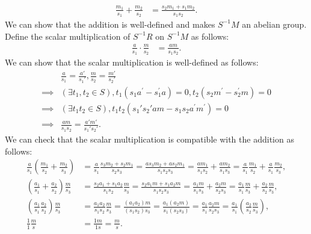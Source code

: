 \begin{solution}
    \begin{align*}
        \frac{m_1}{s_1}+\frac{m_2}{s_2}&=\frac{s_2m_1+s_1m_2}{s_1s_2}.
    \end{align*}
    We can show that the addition is well-defined and makes $S^{-1} M$ an abelian group.\\
    Define the scalar multiplication of $S^{-1}R$ on $S^{-1} M$ as follows:
    \begin{align*}
        \frac{a}{s_1}\cdot\frac{m}{s_2}&=\frac{am}{s_1s_2}.
    \end{align*}
    We can show that the scalar multiplication is well-defined as follows:
    \begin{align*}
        &\frac{a}{s_1}=\frac{a'}{s_1'},\frac{m}{s_2}=\frac{m'}{s_2'}\\
        \implies& (\exists t_1,t_2 \in S), t_1\left(s_1a^{\prime}-s_1^{\prime} a\right)=0,t_2\left(s_2m^{\prime}-s_2^{\prime} m\right)=0\\
        \implies& (\exists t_1t_2 \in S), t_1t_2\left(s_1's_2'am-s_1s_2a^{\prime}m^{\prime}\right)=0\\
        \implies& \frac{am}{s_1s_2}=\frac{a'm'}{s_1's_2'}.
    \end{align*}
    We can check that the scalar multiplication is compatible with the addition as follows:
    \begin{align*}
        \frac{a}{s_1}\left(\frac{m_1}{s_2}+\frac{m_2}{s_3}\right)&= \frac{a}{s_1}\frac{s_3m_2+s_2m_1}{s_2s_3}=\frac{as_3m_2+as_2m_1}{s_1s_2s_3}=\frac{am_1}{s_1s_2}+\frac{am_2}{s_1s_3}=\frac{a}{s_1}\frac{m_1}{s_2}+\frac{a}{s_1}\frac{m_2}{s_3},\\
        \left(\frac{a_1}{s_1}+\frac{a_2}{s_2}\right)\frac{m}{s_3}&=\frac{s_2a_1+s_1a_2}{s_1s_2}\frac{m}{s_3}=\frac{s_2a_1m+s_1a_2m}{s_1s_2s_3}=\frac{a_1m}{s_1s_3}+\frac{a_2m}{s_2s_3}=\frac{a_1}{s_1}\frac{m}{s_3}+\frac{a_2}{s_2}\frac{m}{s_3},\\
        \left(\frac{a_1}{s_1}\frac{a_2}{s_2}\right)\frac{m}{s_3}&=\frac{a_1a_2}{s_1s_2}\frac{m}{s_3}=\frac{(a_1a_2)m}{(s_1s_2)s_3}=\frac{a_1(a_2m)}{s_1(s_2s_3)}=\frac{a_1}{s_1}\frac{a_2m}{s_2s_3}=\frac{a_1}{s_1}\left(\frac{a_2}{s_2}\frac{m}{s_3}\right),\\
        \frac{1}{1}\frac{m}{s}&=\frac{1m}{1s}=\frac{m}{s}.
    \end{align*}   
\end{solution}


















